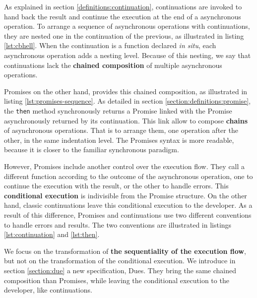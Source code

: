 As explained in section \ref{definitions:continuation}, continuations are invoked to hand back the result and continue the execution at the end of a asynchronous operation.
To arrange a sequence of asynchronous operations with continuations, they are nested one in the continuation of the previous, as illustrated in listing \ref{lst:cbhell}.
When the continuation is a function declared \textit{in situ}, each asynchronous operation adds a nesting level.
Because of this nesting, we say that continuations lack the \textbf{chained composition} of multiple asynchronous operations.

Promises on the other hand, provides this chained composition, as illustrated in listing \ref{lst:promises-sequence}.
As detailed in section \ref{section:definitions:promise}, the \texttt{then} method synchronously returns a Promise linked with the Promise asynchronously returned by its continuation.
This link allow to compose \textbf{chains} of asynchronous operations.
That is to arrange them, one operation after the other, in the same indentation level.
The Promises syntax is more readable, because it is closer to the familiar synchronous paradigm.

However, Promises include another control over the execution flow.
They call a different function according to the outcome of the asynchronous operation, one to continue the execution with the result, or the other to handle errors.
This \textbf{conditional execution} is indivisible from the Promise structure.
On the other hand, classic continuations leave this conditional execution to the developer.
As a result of this difference, Promises and continuations use two different conventions to handle errors and results.
The two conventions are illustrated in listings \ref{lst:continuation} and \ref{lst:then}.

We focus on the transformation of \textbf{the sequentiality of the execution flow}, but not on the transformation of the conditional execution.
We introduce in section \ref{section:due} a new specification, Dues.
They bring the same chained composition than Promises, while leaving the conditional execution to the developer, like continuations.




